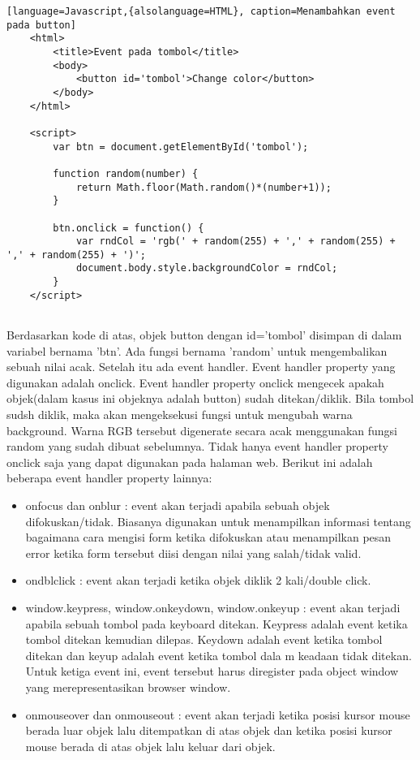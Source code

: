 \begin{lstlisting}[language=Javascript,{alsolanguage=HTML}, caption=Menambahkan event pada button]
	<html>
		<title>Event pada tombol</title>
		<body>
			<button id='tombol'>Change color</button>
		</body>
	</html>
	
	<script>
		var btn = document.getElementById('tombol');

		function random(number) {
  			return Math.floor(Math.random()*(number+1));
		}

		btn.onclick = function() {
  			var rndCol = 'rgb(' + random(255) + ',' + random(255) + ',' + random(255) + ')';
  			document.body.style.backgroundColor = rndCol;
		}
	</script>
	
\end{lstlisting}

Berdasarkan kode di atas, objek button dengan id='tombol' disimpan di dalam variabel bernama 'btn'. Ada fungsi bernama 'random' untuk mengembalikan sebuah nilai acak. Setelah itu ada event handler. Event handler property yang digunakan adalah onclick. Event handler property onclick mengecek apakah objek(dalam kasus ini objeknya adalah button) sudah ditekan/diklik. Bila tombol sudsh diklik, maka akan mengeksekusi fungsi untuk mengubah warna background. Warna RGB tersebut digenerate secara acak menggunakan fungsi random yang sudah dibuat sebelumnya. Tidak hanya event handler property onclick saja yang dapat digunakan pada halaman web. Berikut ini adalah beberapa event handler property lainnya:

\begin{itemize}
	\item onfocus dan onblur : event akan terjadi apabila sebuah objek difokuskan/tidak. Biasanya digunakan untuk menampilkan informasi tentang bagaimana cara mengisi form ketika difokuskan atau menampilkan pesan error ketika form tersebut diisi dengan nilai yang salah/tidak valid.
	\item ondblclick : event akan terjadi ketika objek diklik 2 kali/double click.
	\item window.keypress, window.onkeydown, window.onkeyup : event akan terjadi apabila sebuah tombol pada keyboard ditekan. Keypress adalah event ketika tombol ditekan kemudian dilepas. Keydown adalah event ketika tombol ditekan dan keyup adalah event ketika tombol dala m keadaan tidak ditekan. Untuk ketiga event ini, event tersebut harus diregister pada object window yang merepresentasikan browser window.
	\item onmouseover dan onmouseout : event akan terjadi ketika posisi kursor mouse berada luar objek lalu ditempatkan di atas objek dan ketika posisi kursor mouse berada di atas objek lalu keluar dari objek. 
\end{itemize}

